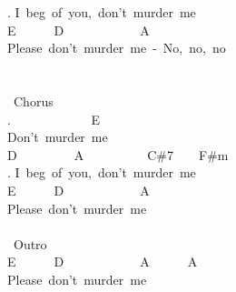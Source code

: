 {. I\ beg\ of\ you,\ don't\ murder\ me\\
E\ \ \ \ \ \ D\ \ \ \ \ \ \ \ \ \ \ \ A\\
Please\ don't\ murder\ me\ -\ No,\ no,\ no\\
\\
\\
\lbrack\ Chorus\rbrack\\
. \ \ \ \ \ \ \ \ \ \ \ \ E\\
Don't\ murder\ me\\
D\ \ \ \ \ \ \ \ \ A\ \ \ \ \ \ \ \ \ \ C\#7\ \ \ \ F\#m\\
. I\ beg\ of\ you,\ don't\ murder\ me\\
E\ \ \ \ \ \ D\ \ \ \ \ \ \ \ \ \ \ \ A\\
Please\ don't\ murder\ me\\
\\
\lbrack\ Outro\rbrack\\
E\ \ \ \ \ \ D\ \ \ \ \ \ \ \ \ \ \ \ A\ \ \ \ \ \ A\\
Please\ don't\ murder\ me\ }
